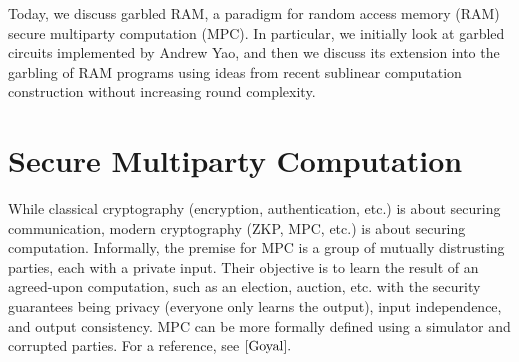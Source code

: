 \newcommand{\bits}{\{0,1\}}
\newcommand{\bfu}{\mathbf{u}}
\newcommand{\bfv}{\mathbf{v}}
\newcommand{\bfp}{\mathbf{p}}
\newcommand{\bfz}{\mathbf{z}}
\newcommand{\bfx}{\mathbf{x}}
\newcommand{\bfy}{\mathbf{y}}

\newcommand{\bbZ}{\mathbb{Z}}
\newcommand{\calR}{\mathcal{R}}
\newcommand{\msf}{\mathsf}
\newcommand{\garble}[1]{\{\{ #1\}\}}

Today, we discuss garbled RAM, a paradigm for random access memory (RAM) secure multiparty computation (MPC). In particular, we initially look at garbled circuits implemented by Andrew Yao\cite{yao}, and then we discuss its extension into the garbling of RAM programs using ideas from recent sublinear computation construction \cite{epigram}\cite{nanogram} without increasing round complexity. 
\section{Secure Multiparty Computation}
While classical cryptography (encryption, authentication, etc.) is about securing communication, modern cryptography (ZKP, MPC, etc.) is about securing computation. 
Informally, the premise for MPC is a group of mutually distrusting parties, each with a private input. Their objective is to learn the result of an agreed-upon computation, such as an election, auction, etc. with the security guarantees being privacy (everyone only learns the output), input independence, and output consistency. MPC can be more formally defined using a simulator and corrupted parties. For a reference, see $\cite{Goyal}.$
